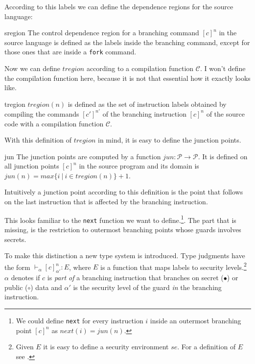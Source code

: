 \documentclass[a4paper,10pt]{llncs}
\begin{document}
According to this labels we can define the dependence regions for the source language:

\begin{definition}{sregion}
The control dependence region for a branching command $[c]^n$ in the source language is
defined as the labels inside the branching command, except for those ones that are inside a
\texttt{fork} command.
\end{definition}

Now we can define $tregion$ according to a compilation function $\mathcal{C}$. I won't define
the compilation function here, because it is not that essential how it exactly looks like.

\begin{definition}{tregion}
$tregion(n)$ is defined as the set of instruction labels obtained by compiling the commands
$[c']^{n'}$ of the branching instruction $[c]^n$ of the source code with a compilation function $\mathcal{C}$.
\end{definition}

With this definition of $tregion$ in mind, it is easy to define the junction points.

\begin{definition}{jun}
The junction points are computed by a function $jun: \mathcal{P} \rightarrow \mathcal{P}$. It is defined
on all junction points $[c]^n$ in the source program and its domain is $jun(n) = max \{i\ |\ i \in tregion(n)\} + 1$.
\end{definition}

Intuitively a junction point according to this definition is the point that follows on the last instruction
that is affected by the branching instruction.

This looks familiar to the \texttt{next} function we want to define.\footnote{We could define \texttt{next} for
every instruction $i$ inside an outermost branching point $[c]^n$ as $next(i) = jun(n)$.}. The part that is
missing, is the restriction to outermost branching points whose guards involves secrets.

To make this distinction a new type system is introduced. Type judgments have the form
$\vdash_\alpha [c]_{\alpha'}^n : E$, where $E$ is a function that maps labels to security
levels.\footnote{Given $E$ it is easy to define a security environment $se$. For a definition
of $E$ see \cite{Barthe06}.} $\alpha$ denotes if $c$ is \textit{part of} a branching
instruction that branches on secret ($\bullet$) or public ($\circ$) data and $\alpha'$ is the
security level of the guard \textit{in} the branching instruction.
\end{document}

